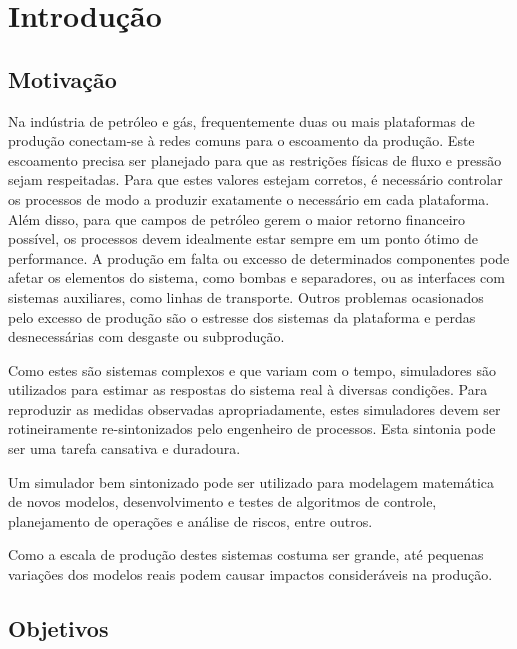 

\chapter{Introdução} \label{chap:1}



\section{Motivação}
Na indústria de petróleo e gás, frequentemente duas ou mais plataformas de produção conectam-se à redes comuns para o escoamento da produção. 
%
Este escoamento precisa ser planejado para que as restrições físicas de fluxo e pressão sejam respeitadas.
%
Para que estes valores estejam corretos, é necessário controlar os processos de modo a produzir exatamente o necessário em cada plataforma.
%
Além disso, para que campos de petróleo gerem o maior retorno financeiro possível, os processos devem idealmente estar sempre em um ponto ótimo de performance.
%
A produção em falta ou excesso de determinados componentes pode afetar os elementos do sistema, como bombas e separadores, ou as interfaces com sistemas auxiliares, como linhas de transporte.
% 
Outros problemas ocasionados pelo excesso de produção são o estresse dos sistemas da plataforma e perdas desnecessárias com desgaste ou subprodução.

Como estes são sistemas complexos e que variam com o tempo, simuladores são utilizados para estimar as respostas do sistema real à diversas condições. 
%
Para reproduzir as medidas observadas apropriadamente, estes simuladores devem ser rotineiramente re-sintonizados pelo engenheiro de processos. 
%
Esta sintonia pode ser uma tarefa cansativa e duradoura.
  
Um simulador bem sintonizado pode ser utilizado para modelagem matemática de novos modelos, desenvolvimento e testes de algoritmos de controle, planejamento de operações e análise de riscos, entre outros.	

Como a escala de produção destes sistemas costuma ser grande, até pequenas variações dos modelos reais podem causar impactos consideráveis na produção.


\section{Objetivos}

